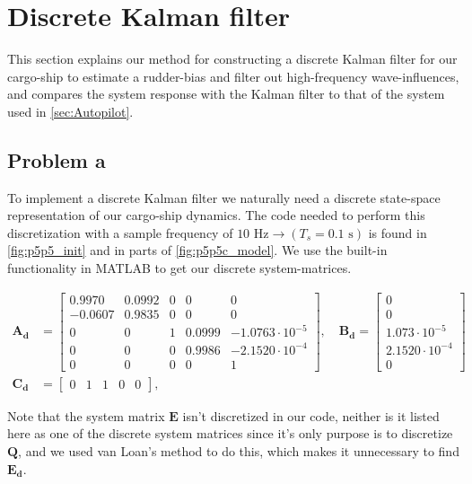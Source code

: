 \section{Discrete Kalman filter}
This section explains our method for constructing a discrete Kalman filter for our cargo-ship to estimate a rudder-bias and filter out high-frequency wave-influences, and compares the system response with the Kalman filter to that of the system used in \cref{sec:Autopilot}.


\subsection{Problem a}
To implement a discrete Kalman filter we naturally need a discrete state-space representation of our cargo-ship dynamics. The code needed to perform this discretization with a sample frequency of $10 \textrm{ Hz} \rightarrow (T_s = 0.1\textrm{ s})$ is found in \cref{fig:p5p5_init} and in parts of \cref{fig:p5p5c_model}. We use the built-in functionality in MATLAB to get our discrete system-matrices.


\begin{equation}\label{eq:sys_discrete}
\begin{aligned}
    \mathbf{A_d} &= 
    \begin{bmatrix} 
    0.9970 & 0.0992 & 0 & 0 & 0 \\
    -0.0607 & 0.9835 & 0 & 0 & 0 \\
    0 & 0 & 1 & 0.0999 & -1.0763\cdot10^{-5} \\
    0 & 0 & 0 & 0.9986 & -2.1520\cdot10^{-4} \\
    0 & 0 & 0 & 0 & 1
    \end{bmatrix}, 
    \quad
    \mathbf{B_d} =
    \begin{bmatrix} 
    0 \\
    0 \\
    1.073\cdot10^{-5} \\
    2.1520\cdot10^{-4} \\
    0 
    \end{bmatrix} 
    \\
    \mathbf{C_d} &= \begin{bmatrix} 
    0 & 1 & 1 & 0 & 0
    \end{bmatrix}, 
\end{aligned}
\end{equation}

Note that the system matrix $\mathbf{E}$ isn't discretized in our code, neither is it listed here as one of the discrete system matrices since it's only purpose is to discretize $\mathbf{Q}$, and we used van Loan's method to do this, which makes it unnecessary to find $\mathbf{E_d}$. \cite{kalman}

